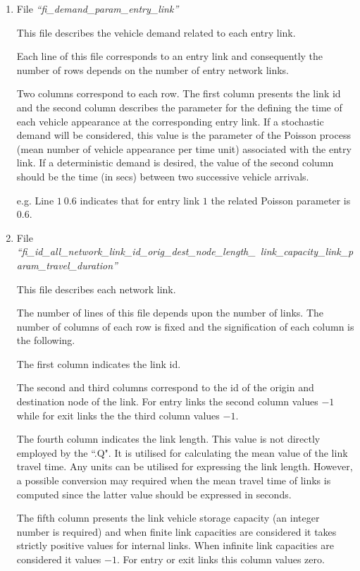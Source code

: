 \documentclass[10pt, conference, compsocconf]{IEEEtran}
\begin{document}
\begin{enumerate}
\item  File \emph{``fi\_demand\_param\_entry\_link''}

This file describes the vehicle demand related to each entry link.


Each line of this file corresponds to an entry link and consequently  the number of rows depends on the number of entry network links. 

Two columns correspond to each row. The first column presents the link id and the second column 
describes the parameter  for the defining the time of each vehicle appearance at the corresponding entry link.
If a stochastic demand will be considered, this value is the parameter of the Poisson process  (mean number of vehicle appearance per time unit) associated with the entry link. 
If a deterministic demand is desired, the value of the second column should  be the time (in secs) between two successive vehicle arrivals.

e.g. Line $1 \	 0.6$ indicates that for  entry link $1$ the related Poisson parameter is $0.6$.

\item File \emph{``fi\_id\_all\_network\_link\_id\_orig\_dest\_node\_length\_\
link\_capacity\_link\_param\_travel\_duration''} 

This file describes each network link. 

The number of lines of this file depends upon the number of links. The number of columns of each row is fixed and the signification of each column is the following.

The first column indicates the  link id.

The second and third columns correspond to the id of the origin and destination node of the link. 
For entry links the second column values $-1$ while for exit links the the third column values $-1$. 

The fourth column indicates the link length. This value is not directly employed by the ``.Q". It is utilised for calculating the mean value of the link travel time. Any units can be utilised for expressing the  link length.
However,  a possible conversion may required  when the mean travel time of links is computed since the latter value should be expressed in seconds. 

The fifth column presents the link vehicle storage capacity (an integer number is required) and when finite link capacities are considered it takes strictly positive values for internal links. When infinite link capacities are considered it values $-1$.
 For entry or exit links this column values  zero.


\end{enumerate}
\end{document}
